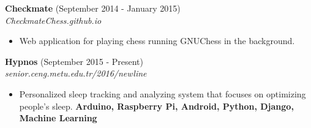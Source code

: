 \documentclass[margin, 10pt]{res} %
\begin{document}
\begin{resume}
        {\bf Checkmate} \hfill (September 2014 - January 2015) \\
        \textit{CheckmateChess.github.io}
        \begin{itemize}
            \item Web application for playing chess running GNUChess in the background.
        \end{itemize}

       

        {\bf Hypnos} \hfill (September 2015 - Present) \\
        \textit{senior.ceng.metu.edu.tr/2016/newline}
        \begin{itemize}
            \item Personalized sleep tracking and analyzing system that focuses on optimizing people's sleep. {\bf Arduino, Raspberry Pi, Android, Python, Django, Machine Learning }
        \end{itemize}



\end{resume}
\end{document}
